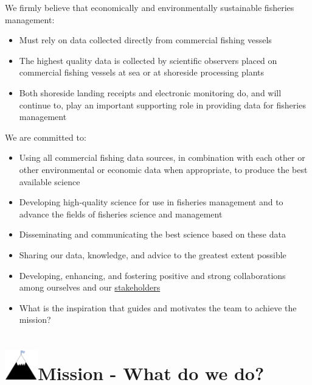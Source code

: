 \documentclass[
  letterpaper,
  DIV=11,
  numbers=noendperiod]{scrreprt}
\providecommand{\tightlist}{%
  \setlength{\itemsep}{0pt}\setlength{\parskip}{0pt}}\usepackage{longtable,booktabs,array}
\begin{document}
We firmly believe that economically and environmentally sustainable
fisheries management:

\begin{itemize}
\tightlist
\item
  Must rely on data collected directly from commercial fishing vessels\\
\item
  The highest quality data is collected by scientific observers placed
  on commercial fishing vessels at sea or at shoreside processing
  plants\\
\item
  Both shoreside landing receipts and electronic monitoring do, and will
  continue to, play an important supporting role in providing data for
  fisheries management
\end{itemize}

We are committed to:

\begin{itemize}
\item
  Using all commercial fishing data sources, in combination with each
  other or other environmental or economic data when appropriate, to
  produce the best available science\\
\item
  Developing high-quality science for use in fisheries management and to
  advance the fields of fisheries science and management\\
\item
  Disseminating and communicating the best science based on these data\\
\item
  Sharing our data, knowledge, and advice to the greatest extent
  possible\\
\item
  Developing, enhancing, and fostering positive and strong
  collaborations among ourselves and our
  \hyperref[subsec-stakeholders]{stakeholders}
\item
  What is the inspiration that guides and motivates the team to achieve
  the mission?
\end{itemize}

\section[Mission - What do we
do?]{\texorpdfstring{\protect\includegraphics[width=\textwidth,height=0.52083in]{_img/mission_icon.png}Mission
- What do we
do?}{Mission - What do we do?}}\label{mission---what-do-we-do}
\end{document}
